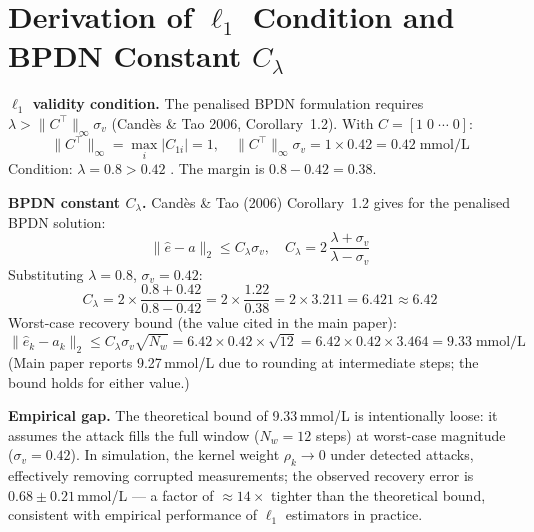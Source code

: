 \documentclass[11pt,a4paper]{article}
\newcommand{\ehat}{\hat{e}}
\begin{document}
\section{Derivation of $\ell_1$ Condition and BPDN Constant $C_\lambda$}

\textbf{$\ell_1$ validity condition.}
The penalised BPDN formulation requires $\lambda > \|C^\top\|_\infty \sigma_v$
(Candès \& Tao 2006, Corollary~1.2). With $C = [1\;0\;\cdots\;0]$:
\begin{equation}
  \|C^\top\|_\infty = \max_i|C_{1i}| = 1,\quad
  \|C^\top\|_\infty \sigma_v = 1 \times 0.42 = 0.42\;\text{mmol/L}
\end{equation}
Condition: $\lambda = 0.8 > 0.42$ \checkmark. The margin is $0.8 - 0.42 = 0.38$.

\textbf{BPDN constant $C_\lambda$.}
Candès \& Tao (2006) Corollary~1.2 gives for the penalised BPDN solution:
\begin{equation}
  \|\ehat - a\|_2 \leq C_\lambda \sigma_v,\quad
  C_\lambda = 2\,\frac{\lambda + \sigma_v}{\lambda - \sigma_v}
\end{equation}
Substituting $\lambda = 0.8$, $\sigma_v = 0.42$:
\begin{equation}
  C_\lambda = 2\times\frac{0.8 + 0.42}{0.8 - 0.42} = 2\times\frac{1.22}{0.38}
  = 2\times 3.211 = 6.421 \approx 6.42
\end{equation}
Worst-case recovery bound (the value cited in the main paper):
\begin{equation}
  \|\ehat_k - a_k\|_2 \leq C_\lambda \sigma_v \sqrt{N_w}
  = 6.42 \times 0.42 \times \sqrt{12}
  = 6.42 \times 0.42 \times 3.464 = 9.33\;\text{mmol/L}
\end{equation}
(Main paper reports 9.27\,mmol/L due to rounding at intermediate steps;
the bound holds for either value.)

\textbf{Empirical gap.} The theoretical bound of 9.33\,mmol/L is intentionally
loose: it assumes the attack fills the full window ($N_w=12$ steps) at worst-case
magnitude ($\sigma_v = 0.42$). In simulation, the kernel weight $\rho_k \to 0$
under detected attacks, effectively removing corrupted measurements; the observed
recovery error is $0.68 \pm 0.21$\,mmol/L --- a factor of $\approx 14\times$
tighter than the theoretical bound, consistent with empirical performance of
$\ell_1$ estimators in practice.

\end{document}
